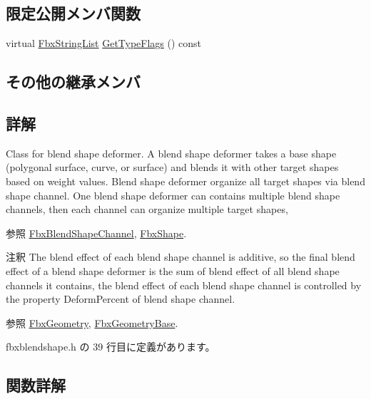 \subsection*{限定公開メンバ関数}
\begin{DoxyCompactItemize}
\item 
virtual \hyperlink{class_fbx_string_list}{Fbx\+String\+List} \hyperlink{class_fbx_blend_shape_aa2b22b70c929ac1ad39b12f0ade998d1}{Get\+Type\+Flags} () const
\end{DoxyCompactItemize}
\subsection*{その他の継承メンバ}


\subsection{詳解}
Class for blend shape deformer. A blend shape deformer takes a base shape (polygonal surface, curve, or surface) and blends it with other target shapes based on weight values. Blend shape deformer organize all target shapes via blend shape channel. One blend shape deformer can contains multiple blend shape channels, then each channel can organize multiple target shapes, \begin{DoxySeeAlso}{参照}
\hyperlink{class_fbx_blend_shape_channel}{Fbx\+Blend\+Shape\+Channel}, \hyperlink{class_fbx_shape}{Fbx\+Shape}. 
\end{DoxySeeAlso}
\begin{DoxyRemark}{注釈}
The blend effect of each blend shape channel is additive, so the final blend effect of a blend shape deformer is the sum of blend effect of all blend shape channels it contains, the blend effect of each blend shape channel is controlled by the property Deform\+Percent of blend shape channel. 
\end{DoxyRemark}
\begin{DoxySeeAlso}{参照}
\hyperlink{class_fbx_geometry}{Fbx\+Geometry}, \hyperlink{class_fbx_geometry_base}{Fbx\+Geometry\+Base}. 
\end{DoxySeeAlso}


 fbxblendshape.\+h の 39 行目に定義があります。



\subsection{関数詳解}
\mbox{\label{class_fbx_blend_shape_a0513dbd59321be93fd18f3aeae79b49a}} 
